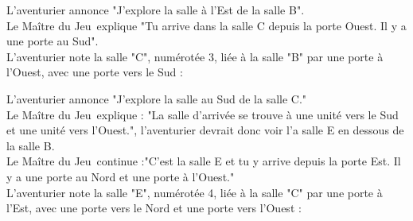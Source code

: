 \documentclass{article}
\newcommand{\fld}{$\boldsymbol{\rightarrow}$}
\newcommand{\mj}{Maître du Jeu}
\begin{document}
        \bigskip

        L'aventurier annonce "J'explore la salle à l'Est de la salle B".\\
        Le \mj\ explique "Tu arrive dans la salle C depuis la porte Ouest. Il y a une porte au Sud".\\
        L'aventurier note la salle "C", numérotée 3, liée à la salle "B" par une porte à l'Ouest, avec une porte vers le Sud :\\

        \bigskip

        \bigskip

        L'aventurier annonce "J'explore la salle au Sud de la salle C."\\
        Le \mj\ explique : "La salle d'arrivée se trouve à une unité vers le Sud et une unité vers l'Ouest.", l'aventurier devrait donc voir l'a salle E en dessous de la salle B.\\
        Le \mj\ continue :"C'est la salle E et tu y arrive depuis la porte Est. Il y a une porte au Nord et une porte à l'Ouest."\\

        L'aventurier note la salle "E", numérotée 4, liée à la salle "C" par une porte à l'Est, avec une porte vers le Nord et une porte vers l'Ouest :\\
\end{document}
